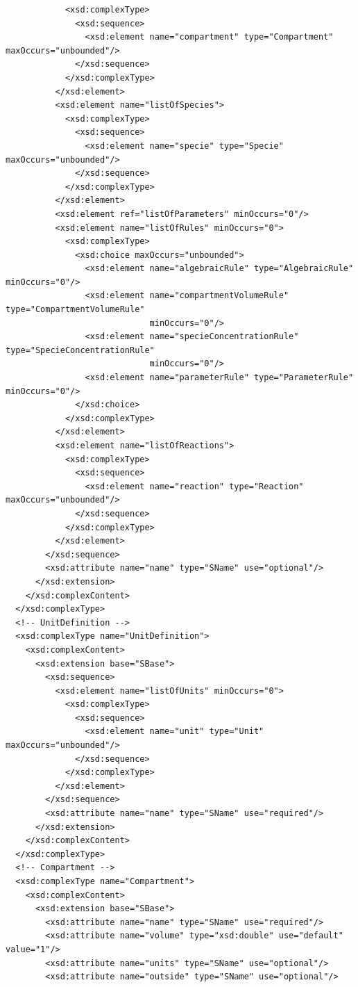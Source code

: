 \documentclass[10pt]{cekarticle}
\begin{document}
\begin{small}
\begin{verbatim}
            <xsd:complexType>
              <xsd:sequence>
                <xsd:element name="compartment" type="Compartment" maxOccurs="unbounded"/>
              </xsd:sequence>
            </xsd:complexType>
          </xsd:element>
          <xsd:element name="listOfSpecies">
            <xsd:complexType>
              <xsd:sequence>
                <xsd:element name="specie" type="Specie" maxOccurs="unbounded"/>
              </xsd:sequence>
            </xsd:complexType>
          </xsd:element>
          <xsd:element ref="listOfParameters" minOccurs="0"/>
          <xsd:element name="listOfRules" minOccurs="0">
            <xsd:complexType>
              <xsd:choice maxOccurs="unbounded">
                <xsd:element name="algebraicRule" type="AlgebraicRule" minOccurs="0"/>
                <xsd:element name="compartmentVolumeRule" type="CompartmentVolumeRule"
                             minOccurs="0"/>
                <xsd:element name="specieConcentrationRule" type="SpecieConcentrationRule" 
                             minOccurs="0"/>
                <xsd:element name="parameterRule" type="ParameterRule" minOccurs="0"/>
              </xsd:choice>
            </xsd:complexType>
          </xsd:element>
          <xsd:element name="listOfReactions">
            <xsd:complexType>
              <xsd:sequence>
                <xsd:element name="reaction" type="Reaction" maxOccurs="unbounded"/>
              </xsd:sequence>
            </xsd:complexType>
          </xsd:element>
        </xsd:sequence>
        <xsd:attribute name="name" type="SName" use="optional"/>
      </xsd:extension>
    </xsd:complexContent>
  </xsd:complexType>
  <!-- UnitDefinition -->
  <xsd:complexType name="UnitDefinition">
    <xsd:complexContent>
      <xsd:extension base="SBase">
        <xsd:sequence>
          <xsd:element name="listOfUnits" minOccurs="0">
            <xsd:complexType>
              <xsd:sequence>
                <xsd:element name="unit" type="Unit" maxOccurs="unbounded"/>
              </xsd:sequence>
            </xsd:complexType>
          </xsd:element>
        </xsd:sequence>
        <xsd:attribute name="name" type="SName" use="required"/>
      </xsd:extension>
    </xsd:complexContent>
  </xsd:complexType>
  <!-- Compartment -->
  <xsd:complexType name="Compartment">
    <xsd:complexContent>
      <xsd:extension base="SBase">
        <xsd:attribute name="name" type="SName" use="required"/>
        <xsd:attribute name="volume" type="xsd:double" use="default" value="1"/>
        <xsd:attribute name="units" type="SName" use="optional"/>
        <xsd:attribute name="outside" type="SName" use="optional"/>

\end{verbatim}
\end{small}
\end{document}
